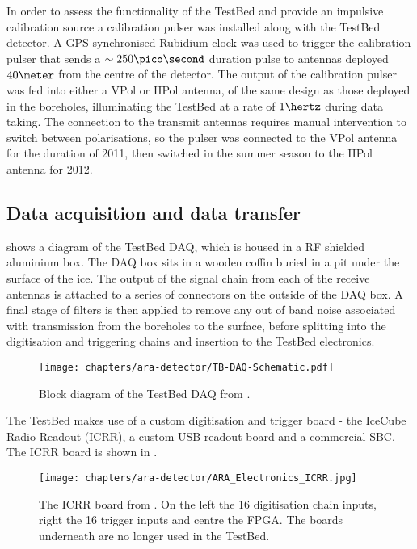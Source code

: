 In order to assess the functionality of the TestBed and provide an impulsive calibration source a calibration pulser was installed along with the TestBed detector. A GPS-synchronised Rubidium clock was used to trigger the calibration pulser that sends a $\sim 250 \pico \second$ duration pulse to antennas deployed $40 \meter$ from the centre of the detector. The output of the calibration pulser was fed into either a VPol or HPol antenna, of the same design as those deployed in the boreholes, illuminating the TestBed at a rate of $1 \hertz$ during data taking. The connection to the transmit antennas requires manual intervention to switch between polarisations, so the pulser was connected to the VPol antenna for the duration of 2011, then switched in the summer season to the HPol antenna for 2012.


\subsection{Data acquisition and data transfer}
\label{sec:ara-detector:TestBed:Data-Acquisition}

 shows a diagram of the TestBed DAQ, which is housed in a RF shielded aluminium box. The DAQ box sits in a wooden coffin buried in a pit under the surface of the ice. The output of the signal chain from each of the receive antennas is attached to a series of connectors on the outside of the DAQ box. A final stage of filters is then applied to remove any out of band noise associated with transmission from the boreholes to the surface, before splitting into the digitisation and triggering chains and insertion to the TestBed electronics.

\begin{figure}[htpb]
  \centering
  \texttt{[image: chapters/ara-detector/TB-DAQ-Schematic.pdf]}
  \caption{Block diagram of the TestBed DAQ from \cite{Allison2012457}.}
  \label{fig:ara-detector:TestBed:DAQ-Schematic}
\end{figure}


The TestBed makes use of a custom digitisation and trigger board - the IceCube Radio Readout (ICRR), a custom USB readout board and a commercial SBC. The ICRR board is shown in .

\begin{figure}[htpb]
  \centering
  \texttt{[image: chapters/ara-detector/ARA\_Electronics\_ICRR.jpg]}
  \caption{The ICRR board from \cite{2011ICRC....4..350A}. On the left the 16 digitisation chain inputs, right the 16 trigger inputs and centre the FPGA. The boards underneath are no longer used in the TestBed.}
  \label{fig:ara-detector:TestBed:ICRR}
\end{figure}

